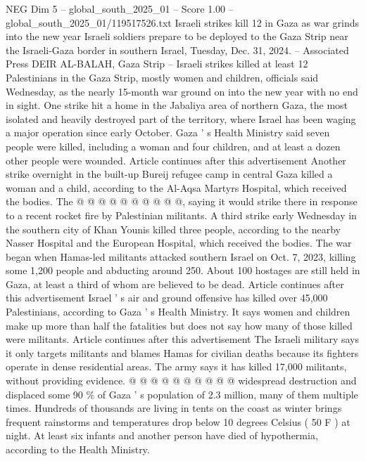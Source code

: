 \begin{textsample}{NEG Dim 5 – global\_south\_2025\_01 – Score 1.00 – global\_south\_2025\_01/119517526.txt}  \label{ex:f5_neg_154}
Israeli strikes kill 12 in Gaza as war grinds into the new year Israeli soldiers prepare to be deployed to the Gaza Strip near the Israeli-Gaza border in southern Israel, Tuesday, Dec. 31, 2024. -- Associated Press DEIR AL-BALAH, Gaza Strip -- Israeli strikes killed at least 12 Palestinians in the Gaza Strip, mostly women and children, officials said Wednesday, as the nearly 15-month war ground on into the new year with no end in sight.
One strike hit a home in the Jabaliya area of northern Gaza, the most isolated and heavily destroyed part of the territory, where Israel has been waging a major operation since early October.
Gaza ' s Health Ministry said seven people were killed, including a woman and four children, and at least a dozen other people were wounded.
Article continues after this advertisement Another strike overnight in the built-up Bureij refugee camp in central Gaza killed a woman and a child, according to the Al-Aqsa Martyrs Hospital, which received the bodies.
The @ @ @ @ @ @ @ @ @ @, saying it would strike there in response to a recent rocket fire by Palestinian militants.
A third strike early Wednesday in the southern city of Khan Younis killed three people, according to the nearby Nasser Hospital and the European Hospital, which received the bodies.
The war began when Hamas-led militants attacked southern Israel on Oct. 7, 2023, killing some 1,200 people and abducting around 250.
About 100 hostages are still held in Gaza, at least a third of whom are believed to be dead.
Article continues after this advertisement Israel ' s air and ground offensive has killed over 45,000 Palestinians, according to Gaza ' s Health Ministry.
It says women and children make up more than half the fatalities but does not say how many of those killed were militants.
Article continues after this advertisement The Israeli military says it only targets militants and blames Hamas for civilian deaths because its fighters operate in dense residential areas.
The army says it has killed 17,000 militants, without providing evidence. @ @ @ @ @ @ @ @ @ @ widespread destruction and displaced some 90 \% of Gaza ' s population of 2.3 million, many of them multiple times.
Hundreds of thousands are living in tents on the coast as winter brings frequent rainstorms and temperatures drop below 10 degrees Celsius ( 50 F ) at night.
At least six infants and another person have died of hypothermia, according to the Health Ministry.

\end{textsample}
